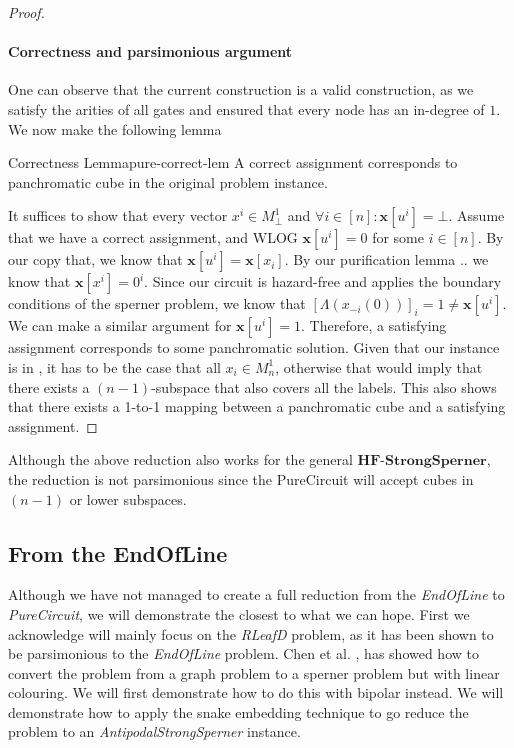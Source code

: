 \begin{proof}
    \paragraph*{Correctness and parsimonious argument}
    One can observe that the current construction is a valid construction, as we satisfy the arities of all gates and ensured
    that every node has an in-degree of $1$. We now make the following lemma

    \begin{lemmabox}{Correctness Lemma}{pure-correct-lem}
        A correct assignment corresponds to panchromatic cube in the original problem instance.
    \end{lemmabox}

    It suffices to show that every vector $x^i \in M^1_\bot$ and $\forall i \in [n]: \mathbf{x}[u^i] = \bot$.
    Assume that we have a correct assignment, and WLOG $\mathbf{x}[u^i] = 0$  for some $i \in [n]$.
    By our copy that, we know that $\mathbf{x}[u^i]= \mathbf{x}[x_i]$.
    By our  purification lemma {..} we know that $\mathbf{x}[x^i] = 0^i$.
    Since our circuit is hazard-free and applies the boundary conditions of the sperner problem, we know that
    $[\Lambda(x_{-i}(0))]_i = 1\neq \mathbf{x}[u^i]$. We can make a similar argument for $\mathbf{x}[u^i] = 1$.
    Therefore, a satisfying assignment corresponds to some panchromatic solution. Given that
    our instance is in , it has to be the case that
    all $x_i \in M^1_n$, otherwise that would imply that there exists a $(n-1)$-subspace that also covers all the labels.
    This also shows that there exists a 1-to-1 mapping between a panchromatic cube and a satisfying assignment.
\end{proof}

Although the above reduction also works for the general $\textbf{HF-StrongSperner}$, the reduction is not parsimonious since
the PureCircuit will accept cubes in $(n-1)$ or lower subspaces.

\subsection{From the EndOfLine}
Although we have not managed to create a full reduction from the
\textit{EndOfLine} to \textit{PureCircuit}, we will demonstrate the closest
to what we can hope. First we acknowledge will mainly focus on
the \textit{RLeafD} problem, as it has been shown to be parsimonious to the \textit{EndOfLine} problem.
Chen et al. \cite{chen_Complexity2DDiscrete_2009}, has showed how to convert the problem from a graph
problem to a sperner problem but with linear colouring. We will first demonstrate how to do this with
bipolar instead. We will demonstrate how to apply the snake embedding technique to go reduce
the problem to an \textit{AntipodalStrongSperner} instance.


